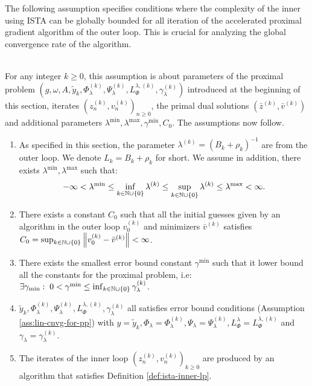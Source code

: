 \documentclass[12pt]{article}
\begin{document}
        \par
        The following assumption specifies conditions where the complexity of the inner using ISTA can be globally bounded for all iteration of the accelerated proximal gradient algorithm of the outer loop. 
        This is crucial for analyzing the global convergence rate of the algorithm. 
        \begin{assumption}\;\label{ass:bounded-inn-cmplx}\\
            For any integer $k \ge 0$, this assumption is about parameters of the proximal problem $\left(g, \omega, A, \tilde y_k, \Phi_\lambda^{(k)}, \Psi_\lambda^{(k)}, L^{\lambda, (k)}_{\Phi} ,\gamma_\lambda^{(k)}\right)$ introduced at the beginning of this section, iterates $\left(z_n^{(k)}, v_n^{(k)}\right)_{n\ge0}$, the primal dual solutions $\left(\bar z^{(k)}, \bar v^{(k)}\right)$ and additional parameters $\lambda^{\min}, \lambda^{\max}, \gamma^{\min}, C_0$. 
            The assumptions now follow. 
            \begin{enumerate}[nosep]
                \item As specified in this section, the parameter $\lambda^{(k)} = (B_k + \rho_k)^{-1}$ are from the outer loop. We denote $L_k = B_k + \rho_k$ for short. We assume in addition, there exists $\lambda^{\min}, \lambda^{\max}$ such that: 
                $$
                    - \infty < \lambda^{\min} \le \inf_{k \in \mathbb N \cup \{0\}} \lambda^{(k)} \le \sup_{k \in \mathbb N \cup \{0\}} \lambda^{(k)} \le \lambda^{\max} < \infty. 
                $$ 
                \item There exists a constant $C_0$ such that all the initial guesses given by an algorithm in the outer loop $v_0^{(k)}$ and minimizers $\bar v^{(k)}$ satisfies $C_0 = \sup_{k \in \mathbb N \cup \{0\}}\left\Vert v_0^{(k)} - \bar v^{(k)}\right\Vert < \infty$. 
                \item There exists the smallest error bound constant $\gamma^{\min}$ such that it lower bound all the constants for the proximal problem, i.e: $\exists \gamma_{\min}:\;0 < \gamma^{\min} \le \inf_{k \in \mathbb N \cup \{0\}} \gamma^{(k)}_\lambda$. 
                \item $\tilde y_k, \Phi_\lambda^{(k)}, \Psi_\lambda^{(k)}, L^{\lambda, (k)}_{\Phi} ,\gamma_\lambda^{(k)}$ all satisfies error bound conditions (Assumption \ref{ass:lin-cnvg-for-pp}) with $y = \tilde y_k, \Phi_\lambda = \Phi_\lambda^{(k)}, \Psi_\lambda = \Psi_\lambda^{(k)}, L_\Phi^\lambda = L^{\lambda, (k)}_{\Phi}$ and $\gamma_\lambda = \gamma_\lambda^{(k)}$. 
                \item The iterates of the inner loop $(z_n^{(k)}, v_n^{(k)})_{k \ge 0}$ are produced by an algorithm that satisfies Definition \ref{def:ista-inner-lp}. 
            \end{enumerate}
        \end{assumption}
\end{document}
